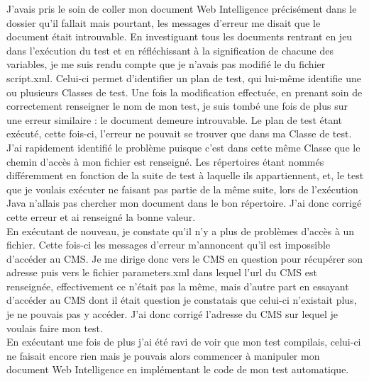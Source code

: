 J'avais pris le soin de coller mon document Web Intelligence pr\'{e}cis\'{e}ment dans le dossier qu'il fallait mais pourtant, les messages d'erreur me disait que le document \'{e}tait introuvable. En investiguant tous les documents rentrant en jeu dans l'ex\'{e}cution du test et en r\'{e}fl\'{e}chissant \`{a} la signification de chacune des variables, je me suis rendu compte que je n'avais pas modifi\'{e} le  du fichier script.xml. Celui-ci permet d'identifier un plan de test, qui lui-m\^{e}me identifie une ou plusieurs \gls{Classe}s de test. Une fois la modification effectu\'{e}e, en prenant soin de correctement renseigner le nom de mon test, je suis tomb\'{e} une fois de plus sur une erreur similaire : le document demeure introuvable. Le plan de test \'{e}tant ex\'{e}cut\'{e}, cette fois-ci, l'erreur ne pouvait se trouver que dans ma \gls{Classe} de test. J'ai rapidement identifi\'{e} le probl\`{e}me puisque c'est dans cette m\^{e}me \gls{Classe} que le chemin d'acc\`{e}s \`{a} mon fichier est renseign\'{e}. Les r\'{e}pertoires \'{e}tant nomm\'{e}s diff\'{e}remment en fonction de la suite de test \`{a} laquelle ils appartiennent, et, le test que je voulais ex\'{e}cuter ne faisant pas partie de la m\^{e}me suite, lors de l'ex\'{e}cution Java n'allais pas chercher mon document dans le bon r\'{e}pertoire. J'ai donc corrig\'{e} cette erreur et ai renseign\'{e} la bonne valeur.\\
En ex\'{e}cutant de nouveau, je constate qu'il n'y a plus de probl\`{e}mes d'acc\`{e}s \`{a} un fichier. Cette fois-ci les messages d'erreur m'annoncent qu'il est impossible d'acc\'{e}der au \gls{CMS}. Je me dirige donc vers le \gls{CMS} en question pour r\'{e}cup\'{e}rer son adresse puis vers le fichier parameters.xml dans lequel l'url du \gls{CMS} est renseign\'{e}e, effectivement ce n'\'{e}tait pas la m\^{e}me, mais d'autre part en essayant d'acc\'{e}der au \gls{CMS} dont il \'{e}tait question je constatais que celui-ci n'existait plus, je ne pouvais pas y acc\'{e}der. J'ai donc corrig\'{e} l'adresse du \gls{CMS} sur lequel je voulais faire mon test.\\
En ex\'{e}cutant une fois de plus j'ai \'{e}t\'{e} ravi de voir que mon test compilais, celui-ci ne faisait encore rien mais je pouvais alors commencer \`{a} manipuler mon document Web Intelligence en impl\'{e}mentant le code de mon test automatique.\\

